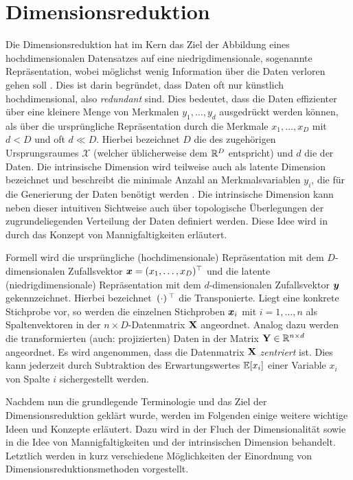 \chapter{Dimensionsreduktion}
\label{ch:Dimensionsreduktion}

Die Dimensionsreduktion hat im Kern das Ziel der Abbildung eines hochdimensionalen Datensatzes auf
eine niedrigdimensionale, sogenannte  Repräsentation, wobei möglichst wenig
Information über die Daten verloren gehen soll \parencite[2]{Lee.2007}. Dies ist darin begründet, dass Daten oft nur künstlich hochdimensional, also
\textit{redundant} sind. Dies bedeutet, dass die Daten effizienter über eine kleinere Menge von
Merkmalen $y_1,\ldots,y_d$ ausgedrückt werden können, als über die ursprüngliche Repräsentation
durch die Merkmale $x_1,\ldots,x_D$ mit $d < D$ und oft $d \ll D$. Hierbei bezeichnet $D$ die
 des zugehörigen Ursprungsraumes $\mathcal{X}$ (welcher
üblicherweise dem $\mathbb{R}^D$ entspricht) und $d$ die  der Daten. Die
intrinsische Dimension wird teilweise auch als latente Dimension bezeichnet und beschreibt die
minimale Anzahl an Merkmalsvariablen $y_i$, die für die Generierung der Daten benötigt werden \parencite[47]{Lee.2007}. Die intrinsische Dimension kann neben dieser intuitiven Sichtweise auch über
topologische Überlegungen der zugrundeliegenden Verteilung der Daten definiert werden. Diese Idee
wird in  durch das Konzept von
Mannigfaltigkeiten erläutert.

Formell wird die ursprüngliche (hochdimensionale) Repräsentation mit dem $D$-dimensionalen
Zufallsvektor $\bm{x} = (x_1, \ldots, x_D)^\top$ und die latente (niedrigdimensionale)
Repräsentation mit dem $d$-dimensionalen Zufallsvektor $\bm{y}$ gekennzeichnet. Hierbei
bezeichnet $\,(\cdot)\,^\top$ die Transponierte. Liegt eine konkrete Stichprobe vor, so werden die
einzelnen Stichproben $\bm{x}_i$ mit $i = 1, \ldots,n$ als Spaltenvektoren in der $n \times
	D$-Datenmatrix $\mathbf{X}$ angeordnet. Analog dazu werden die transformierten (auch: projizierten)
Daten in der Matrix $\mathbf{Y} \in \mathbb{R}^{n \times d}$ angeordnet. Es wird angenommen, dass die
Datenmatrix $\mathbf{X}$ \textit{zentriert} ist. Dies kann jederzeit durch Subtraktion des
Erwartungswertes $\operatorname{\mathbb{E}}[x_i]$ einer Variable $x_i$ von Spalte $i$ sichergestellt werden.

Nachdem nun die grundlegende Terminologie und das Ziel der Dimensionsreduktion geklärt wurde,
werden im Folgenden einige weitere wichtige Ideen und Konzepte erläutert. Dazu wird in
 der Fluch der Dimensionalität sowie in
 die Idee von Mannigfaltigkeiten und
der intrinsischen Dimension behandelt. Letztlich werden in 
kurz verschiedene Möglichkeiten der Einordnung von Dimensionsreduktionsmethoden vorgestellt.

